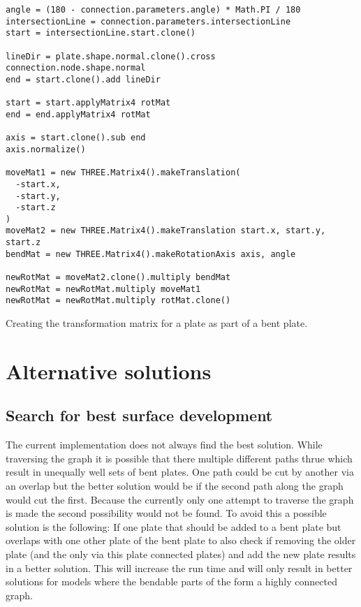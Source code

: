 \documentclass[../ClassicThesis.tex]{subfiles}
\begin{document}
\begin{listing}[ht]
\begin{verbatim}
angle = (180 - connection.parameters.angle) * Math.PI / 180
intersectionLine = connection.parameters.intersectionLine
start = intersectionLine.start.clone()

lineDir = plate.shape.normal.clone().cross connection.node.shape.normal
end = start.clone().add lineDir

start = start.applyMatrix4 rotMat
end = end.applyMatrix4 rotMat

axis = start.clone().sub end
axis.normalize()

moveMat1 = new THREE.Matrix4().makeTranslation(
  -start.x,
  -start.y,
  -start.z
)
moveMat2 = new THREE.Matrix4().makeTranslation start.x, start.y, start.z
bendMat = new THREE.Matrix4().makeRotationAxis axis, angle

newRotMat = moveMat2.clone().multiply bendMat
newRotMat = newRotMat.multiply moveMat1
newRotMat = newRotMat.multiply rotMat.clone()
\end{verbatim}
\caption{Creating the transformation matrix for a plate as part of a bent plate.}
\label{lst:bend-matrix}
\end{listing}

\section{Alternative solutions}

\subsection{Search for best surface development}

The current implementation does not always find the best solution. While traversing the graph it is possible that there multiple different paths thrue  which result in unequally well sets of bent plates. One path could be cut by another via an overlap but the better solution would be if the second path along the graph would cut the first. Because the currently only one attempt to traverse the graph is made the second possibility would not be found.
To avoid this a possible solution is the following: If one plate that should be added to a bent plate but overlaps with one other plate of the bent plate to also check if removing the older plate (and the only via this plate connected plates) and add the new plate results in a better solution.
This will increase the run time and will only result in better solutions for models where the bendable parts of the \threedmodel{} form a highly connected graph.
\end{document}
